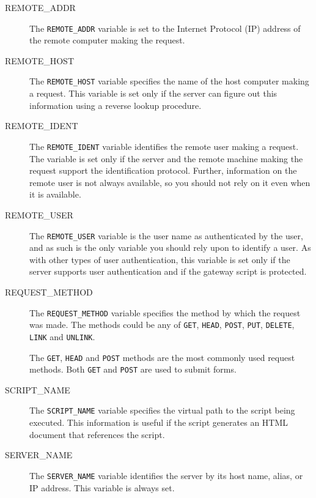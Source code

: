 \begin{description}
\item[REMOTE\_ADDR]

The \verb|REMOTE_ADDR| variable is set to the Internet Protocol (IP) address
of the remote computer making the request. 

\item[REMOTE\_HOST]

The \verb|REMOTE_HOST| variable specifies the name of the host computer making a
request. This variable is set only if the server can figure out this
information using a reverse lookup procedure. 

\item[REMOTE\_IDENT]

The \verb|REMOTE_IDENT| variable identifies the remote user making a request. The
variable is set only if the server and the remote machine making the
request support the identification protocol. Further, information on the
remote user is not always available, so you should not rely on it even
when it is available. 

\item[REMOTE\_USER]

The \verb|REMOTE_USER| variable is the user name as authenticated by the user,
and as such is the only variable you should rely upon to identify a user.
As with other types of user authentication, this variable is set only if
the server supports user authentication and if the gateway script is
protected. 

\item[REQUEST\_METHOD]

The \verb|REQUEST_METHOD| variable specifies the method by which the request
was made. The methods could be any of \verb|GET|, \verb|HEAD|, \verb|POST|,
\verb|PUT|, \verb|DELETE|, \verb|LINK| and  \verb|UNLINK|.

The \verb|GET|, \verb|HEAD| and \verb|POST| methods are the most commonly
used request methods. Both \verb|GET| and \verb|POST| are used to submit forms. 

\item[SCRIPT\_NAME]

The \verb|SCRIPT_NAME| variable specifies the virtual path to the script being
executed. This information is useful if the script generates an HTML document
that references the script.

\item[SERVER\_NAME]

The \verb|SERVER_NAME| variable identifies the server by its host name, alias,
or IP address. This variable is always set.


\end{description}
